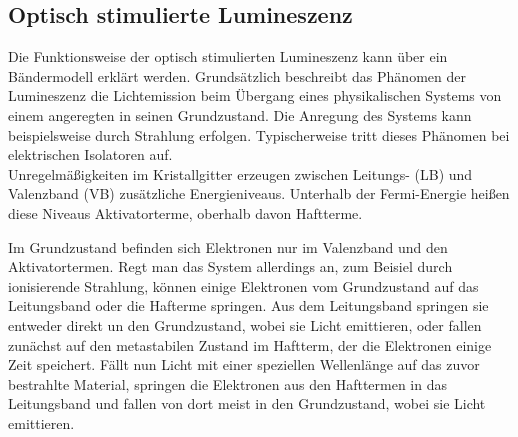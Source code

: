 \subsection{Optisch stimulierte Lumineszenz}

Die Funktionsweise der optisch stimulierten Lumineszenz kann über ein Bändermodell erklärt werden. Grundsätzlich beschreibt das Phänomen der Lumineszenz die Lichtemission beim Übergang eines physikalischen Systems von einem angeregten in seinen Grundzustand.
Die Anregung des Systems kann beispielsweise durch Strahlung erfolgen. Typischerweise tritt dieses Phänomen bei elektrischen Isolatoren auf.\\
Unregelmäßigkeiten im Kristallgitter erzeugen zwischen Leitungs- (LB) und Valenzband (VB) zusätzliche Energieniveaus. Unterhalb der Fermi-Energie heißen diese Niveaus Aktivatorterme, oberhalb davon Haftterme. 

\begin{center}
    \minipanf    
    \label{fig:band}
    \minipend
\end{center}

Im Grundzustand befinden sich Elektronen nur im Valenzband und den Aktivatortermen.
Regt man das System allerdings an, zum Beisiel durch ionisierende Strahlung, können einige Elektronen vom Grundzustand auf das Leitungsband oder die Hafterme springen. Aus dem Leitungsband springen sie entweder direkt un den Grundzustand, wobei sie Licht emittieren, oder fallen zunächst auf den metastabilen Zustand im Haftterm, der die Elektronen einige Zeit speichert.
Fällt nun Licht mit einer speziellen Wellenlänge auf das zuvor bestrahlte Material, springen die Elektronen aus den Hafttermen in das Leitungsband und fallen von dort meist in den Grundzustand, wobei sie Licht emittieren.

